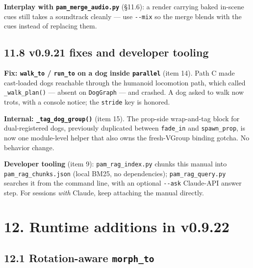 \documentclass[
  11pt,
]{book}
\begin{document}
\textbf{Interplay with \texttt{pam\_merge\_audio.py}} (§11.6): a
render carrying baked in-scene cues still takes a soundtrack cleanly
--- use \texttt{-{}-mix} so the merge blends with the cues instead of
replacing them.

\subsection{\texorpdfstring{11.8 v0.9.21 fixes and developer
tooling}{11.8 v0.9.21 fixes and developer tooling}}\label{v0921-fixes-and-tooling}

\textbf{Fix: \texttt{walk\_to} / \texttt{run\_to} on a dog inside
\texttt{parallel}} (item 14). Path C made cast-loaded dogs reachable
through the humanoid locomotion path, which called
\texttt{\_walk\_plan()} --- absent on \texttt{DogGraph} --- and
crashed. A dog asked to walk now trots, with a console notice; the
\texttt{stride} key is honored.

\textbf{Internal: \texttt{\_tag\_dog\_group()}} (item 15). The
prop-side wrap-and-tag block for dual-registered dogs, previously
duplicated between \texttt{fade\_in} and \texttt{spawn\_prop}, is now
one module-level helper that also owns the fresh-VGroup binding
gotcha. No behavior change.

\textbf{Developer tooling} (item 9): \texttt{pam\_rag\_index.py}
chunks this manual into \texttt{pam\_rag\_chunks.json} (local BM25, no
dependencies); \texttt{pam\_rag\_query.py} searches it from the
command line, with an optional \texttt{-{}-ask} Claude-API answer
step. For sessions \emph{with} Claude, keep attaching the manual
directly.

\section{12. Runtime additions in
v0.9.22}\label{runtime-additions-in-v0.9.22}

\subsection{\texorpdfstring{12.1 Rotation-aware
\texttt{morph\_to}}{12.1 Rotation-aware morph\_to}}\label{rotation-aware-morph-to}
\end{document}
